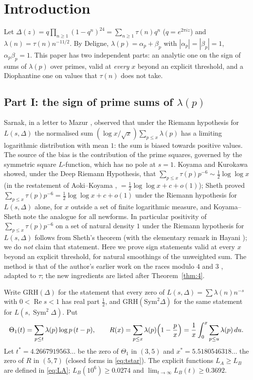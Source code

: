 \documentclass[11pt]{amsart}
\theoremstyle{definition}
\numberwithin{equation}{section}
\newcommand{\re}{\operatorname{Re}}
\newcommand{\Sym}{\operatorname{Sym}^2}
\newcommand{\GRHD}{\mathrm{GRH}(\Delta)}
\newcommand{\GRHS}{\mathrm{GRH}(\mathrm{Sym}^2\Delta)}
\begin{document}
\medskip
\tableofcontents

\section{Introduction}\label{sec:intro}

Let $\Delta(z)=q\prod_{n\ge1}(1-q^n)^{24}=\sum_{n\ge1}\tau(n)q^n$ ($q=e^{2\pi i z}$) and $\lambda(n)=\tau(n)n^{-11/2}$. By Deligne, $\lambda(p)=\alpha_p+\beta_p$ with $|\alpha_p|=|\beta_p|=1$, $\alpha_p\beta_p=1$. This paper has two independent parts: an analytic one on the sign of sums of $\lambda(p)$ over primes, valid at \emph{every} $x$ beyond an explicit threshold, and a Diophantine one on values that $\tau(n)$ does not take.

\subsection{Part I: the sign of prime sums of \texorpdfstring{$\lambda(p)$}{lambda(p)}}
Sarnak, in a letter to Mazur \cite{Sarnak}, observed that under the Riemann hypothesis for $L(s,\Delta)$ the normalised sum $(\log x/\sqrt x)\sum_{p\le x}\lambda(p)$ has a limiting logarithmic distribution with mean $1$: the sum is biased towards positive values. The source of the bias is the contribution of the prime squares, governed by the symmetric square $L$-function, which has no pole at $s=1$. Koyama and Kurokawa \cite{KK} showed, under the Deep Riemann Hypothesis, that $\sum_{p\le x}\tau(p)p^{-6}\sim\frac12\log\log x$ (in the restatement of Aoki--Koyama \cite{AK}, $=\frac12\log\log x+c+o(1)$); Sheth \cite[Corollary~B]{Sheth} proved $\sum_{p\le x}\tau(p)p^{-6}=\frac12\log\log x+c+o(1)$ under the Riemann hypothesis for $L(s,\Delta)$ alone, for $x$ outside a set of finite logarithmic measure, and Koyama--Sheth \cite{KS} note the analogue for all newforms. In particular positivity of $\sum_{p\le x}\tau(p)p^{-6}$ on a set of natural density $1$ under the Riemann hypothesis for $L(s,\Delta)$ follows from Sheth's theorem (with the elementary remark in Hayani \cite[(1.5)]{Hayani}); we do \emph{not} claim that statement. Here we prove sign statements valid at every $x$ beyond an explicit threshold, for natural smoothings of the unweighted sum. The method is that of the author's earlier work on the races modulo $4$ and $3$ \cite{WR}, adapted to $\tau$; the new ingredients are listed after Theorem~\ref{thm:4}.

Write $\GRHD$ for the statement that every zero of $L(s,\Delta)=\sum\lambda(n)n^{-s}$ with $0<\re s<1$ has real part $\frac12$, and $\GRHS$ for the same statement for $L(s,\Sym\Delta)$. Put
\[
\Theta_1(t)=\sum_{p\le t}\lambda(p)\log p\,(t-p),\qquad R(x)=\sum_{p\le x}\lambda(p)\Bigl(1-\frac px\Bigr)=\frac1x\int_0^x\sum_{p\le u}\lambda(p)\,du .
\]
Let $t^*=4.2667919563\ldots$ be the zero of $\Theta_1$ in $(3,5)$ and $x^*=5.5180546318\ldots$ the zero of $R$ in $(5,7)$ (closed forms in \eqref{eq:tstar}). The explicit functions $L_A\ge L_B$ are defined in \eqref{eq:LA}; $L_B(10^6)\ge0.0274$ and $\lim_{t\to\infty}L_B(t)\ge0.3692$.
\end{document}
